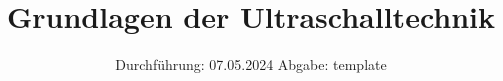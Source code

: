 

\subject{US1}
\title{Grundlagen der Ultraschalltechnik}
\date{%
  Durchführung: 07.05.2024
  \hspace{3em}
  Abgabe: template
}



\maketitle
\thispagestyle{empty}
\tableofcontents
\newpage






\printbibliography{}

